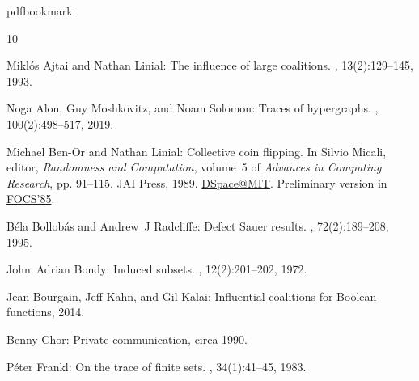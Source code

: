 \newcommand{\prelim}{Preliminary version in\ }\newcommand{\prelims}{Preliminary
  versions in\ }
\providecommand{\bibhead}[1]{}
\expandafter\ifx\csname pdfbookmark\endcsname\relax%
  \providecommand{\tocrefpdfbookmark}{}
\else\providecommand{\tocrefpdfbookmark}{%
   \hypertarget{tocreferences}{}%
   \pdfbookmark[1]{References}{tocreferences}}%
\fi

\tocrefpdfbookmark
\begin{thebibliography}{10}

\bibhead{AL}
{\sc Mikl{\'o}s Ajtai and Nathan Linial}: The influence of large coalitions.
, 13(2):129--145, 1993.
\newblock [\epfmtdoi{10.1007/BF01303199}]

\bibhead{AMS19}
{\sc Noga Alon, Guy Moshkovitz, and Noam Solomon}: Traces of hypergraphs.
, 100(2):498--517, 2019.

\bibhead{bl}
{\sc Michael Ben-Or and Nathan Linial}: Collective coin flipping.
\newblock In {\sc Silvio Micali}, editor, {\em Randomness and Computation},
  volume~5 of {\em Advances in Computing Research}, pp. 91--115. JAI Press,
  1989.
\newblock \href{https://hdl.handle.net/1721.1/151177}{DSpace@MIT}. \prelim
  \href{https://doi.org/10.1109/SFCS.1985.15}{FOCS'85}.

\bibhead{BR}
{\sc B{\'e}la Bollob{\'a}s and Andrew~J Radcliffe}: Defect {S}auer results.
, 72(2):189--208, 1995.
\newblock [\epfmtdoi{10.1016/0097-3165(95)90060-8}]

\bibhead{Bo}
{\sc John~Adrian Bondy}: Induced subsets.
, 12(2):201--202, 1972.
\newblock [\epfmtdoi{10.1016/0095-8956(72)90025-1}]

\bibhead{BKK21}
{\sc Jean Bourgain, Jeff Kahn, and Gil Kalai}: Influential coalitions for
  {B}oolean functions, 2014.

\bibhead{benny}
{\sc Benny Chor}: Private communication, circa 1990.

\bibhead{Fr}
{\sc P\'eter Frankl}: On the trace of finite sets.
, 34(1):41--45, 1983.
\newblock [\epfmtdoi{10.1016/0097-3165(83)90038-9}]


\end{thebibliography}
